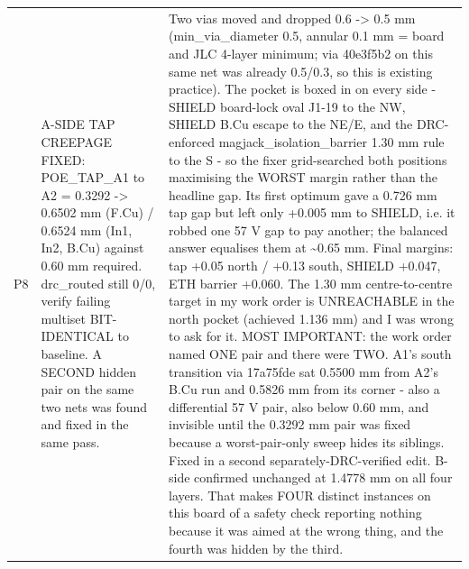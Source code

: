 \documentclass[11pt,a4paper]{article}
\begin{document}
{\begin{longtable}{lp{5.2cm}p{7.2cm}}
P8 & A-SIDE TAP CREEPAGE FIXED: POE\_TAP\_A1 to A2 = 0.3292 -\textgreater{} 0.6502 mm (F.Cu) / 0.6524 mm (In1, In2, B.Cu) against 0.60 mm required. drc\_routed still 0/0, verify failing multiset BIT-IDENTICAL to baseline. A SECOND hidden pair on the same two nets was found and fixed in the same pass. & Two vias moved and dropped 0.6 -\textgreater{} 0.5 mm (min\_via\_diameter 0.5, annular 0.1 mm = board and JLC 4-layer minimum; via 40e3f5b2 on this same net was already 0.5/0.3, so this is existing practice). The pocket is boxed in on every side - SHIELD board-lock oval J1-19 to the NW, SHIELD B.Cu escape to the NE/E, and the DRC-enforced magjack\_isolation\_barrier 1.30 mm rule to the S - so the fixer grid-searched both positions maximising the WORST margin rather than the headline gap. Its first optimum gave a 0.726 mm tap gap but left only +0.005 mm to SHIELD, i.e. it robbed one 57 V gap to pay another; the balanced answer equalises them at \textasciitilde{}0.65 mm. Final margins: tap +0.05 north / +0.13 south, SHIELD +0.047, ETH barrier +0.060. The 1.30 mm centre-to-centre target in my work order is UNREACHABLE in the north pocket (achieved 1.136 mm) and I was wrong to ask for it. MOST IMPORTANT: the work order named ONE pair and there were TWO. A1's south transition via 17a75fde sat 0.5500 mm from A2's B.Cu run and 0.5826 mm from its corner - also a differential 57 V pair, also below 0.60 mm, and invisible until the 0.3292 mm pair was fixed because a worst-pair-only sweep hides its siblings. Fixed in a second separately-DRC-verified edit. B-side confirmed unchanged at 1.4778 mm on all four layers. That makes FOUR distinct instances on this board of a safety check reporting nothing because it was aimed at the wrong thing, and the fourth was hidden by the third. \\

\end{longtable}}
\end{document}
